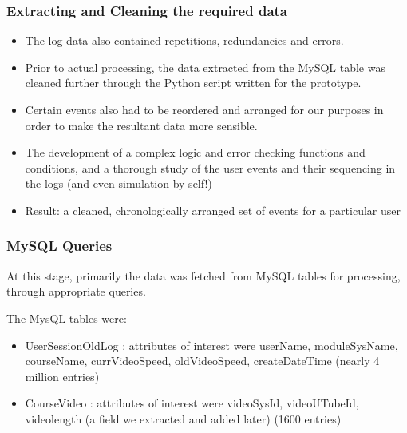 \documentclass[12pt,xcolor=dvipsnames]{beamer}
\begin{document}
\begin{frame}[t]
\frametitle{Extracting and Cleaning the required data}

\begin{itemize}

\item The log data also contained repetitions, redundancies and errors.
\item Prior to actual processing, the data extracted from the MySQL table was cleaned further through the Python script written for the prototype.
\item Certain events also had to be reordered and arranged for our purposes in order to make the resultant data more sensible.

\item The development of a complex logic and error checking functions and conditions, and a thorough study of the user events and their sequencing in the logs (and even simulation by self!)

\item Result: a cleaned, chronologically arranged set of events for a particular user


\end{itemize}

\end{frame}


\begin{frame}[t]
\frametitle{MySQL Queries}

At this stage, primarily the data was fetched from MySQL tables for processing, through appropriate queries.

The MysQL tables were:
\begin{itemize}
\item UserSessionOldLog : attributes of interest were userName, moduleSysName, courseName, currVideoSpeed, oldVideoSpeed, createDateTime     (nearly 4 million entries)

\item CourseVideo : attributes of interest were videoSysId, videoUTubeId, videolength (a field we extracted and added later) (1600 entries)

\end{itemize}

\end{frame}
\end{document}
